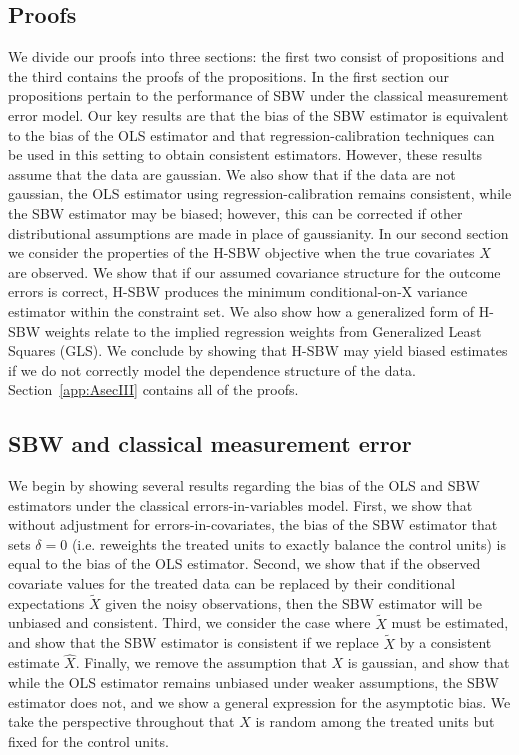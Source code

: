 \documentclass[aoas]{imsart}
\theoremstyle{plain}
\theoremstyle{remark}
\begin{document}
\begin{appendix}

%
\section{Proofs}\label{ssec:proof}

We divide our proofs into three sections: the first two consist of propositions and the third contains the proofs of the propositions. In the first section our propositions pertain to the performance of SBW under the classical measurement error model. Our key results are that the bias of the SBW estimator is equivalent to the bias of the OLS estimator and that regression-calibration techniques can be used in this setting to obtain consistent estimators. However, these results assume that the data are gaussian. We also show that if the data are not gaussian, the OLS estimator using regression-calibration remains consistent, while the SBW estimator may be biased; however, this can be corrected if other distributional assumptions are made in place of gaussianity. In our second section we consider the properties of the H-SBW objective when the true covariates $X$ are observed. We show that if our assumed covariance structure for the outcome errors is correct, H-SBW produces the minimum conditional-on-X variance estimator within the constraint set. We also show how a generalized form of H-SBW weights relate to the implied regression weights from Generalized Least Squares (GLS). We conclude by showing that H-SBW may yield biased estimates if we do not correctly model the dependence structure of the data. Section~\ref{app:AsecIII} contains all of the proofs.

\subsection{SBW and classical measurement error}\label{app:AsecI}

We begin by showing several results regarding the bias of the OLS and SBW estimators under the classical errors-in-variables model. First, we show that without adjustment for errors-in-covariates, the bias of the SBW estimator that sets $\delta = 0$ (i.e. reweights the treated units to exactly balance the control units) is equal to the bias of the OLS estimator. Second, we show that if the observed covariate values for the treated data can be replaced by their conditional expectations $\tilde{X}$ given the noisy observations, then the SBW estimator will be unbiased and consistent. Third, we consider the case where $\tilde{X}$ must be estimated, and show that the SBW estimator is consistent if we replace $\tilde{X}$ by a consistent estimate $\hat{X}$. Finally, we remove the assumption that $X$ is gaussian, and show that while the OLS estimator remains unbiased under weaker assumptions, the SBW estimator does not, and we show a general expression for the asymptotic bias. We take the perspective throughout that $X$ is random among the treated units but fixed for the control units.


\end{appendix}
\end{document}
